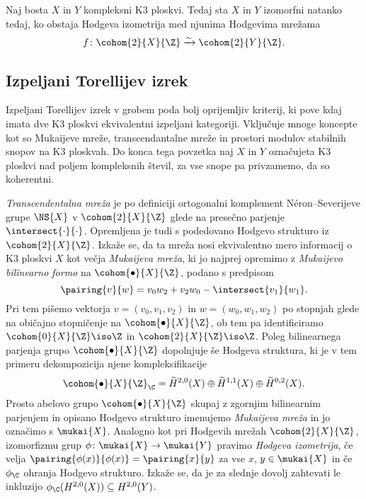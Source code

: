 \begin{izrek}
    Naj bosta $X$ in $Y$ kompleksni K3 ploskvi. Tedaj sta $X$ in $Y$ izomorfni natanko tedaj, ko obstaja Hodgeva izometrija med njunima Hodgevima mrežama
    \[
        f\colon \cohom{2}{X}{\Z} \xrightarrow{\sim} \cohom{2}{Y}{\Z}.
    \]
\end{izrek}


\subsection*{Izpeljani Torellijev izrek}

Izpeljani Torellijev izrek v grobem poda bolj oprijemljiv kriterij, ki pove kdaj imata dve K3 ploskvi ekvivalentni izpeljani kategoriji.
Vključuje mnoge koncepte kot so Mukaijeve mreže, transcendantalne mreže in prostori modulov stabilnih snopov na K3 ploskvah. Do konca tega povzetka naj $X$ in $Y$ označujeta K3 ploskvi nad poljem kompleksnih števil, za vse snope pa privzamemo, da so koherentni.  

\emph{Transcendentalna mreža} je po definiciji ortogonalni komplement Néron--Severijeve grupe $\NS{X}$ v $\cohom{2}{X}{\Z}$ glede na presečno parjenje $\intersect{\cdot}{\cdot}$. Opremljena je tudi s podedovano Hodgevo strukturo iz $\cohom{2}{X}{\Z}$. Izkaže se, da ta mreža nosi ekvivalentno mero informacij o K3 ploskvi $X$ kot večja \emph{Mukaijeva mreža}, ki jo najprej opremimo z \emph{Mukaijevo bilinearno formo} na $\cohom{\bullet}{X}{\Z}$, podano s predpisom 
\[
    \pairing{v}{w} = v_0w_2 + v_2w_0 - \intersect{v_1}{w_1}.
\]
Pri tem pišemo vektorja $v = (v_0, v_1, v_2)$ in $w = (w_0, w_1, w_2)$ po stopnjah glede na običajno stopničenje na $\cohom{\bullet}{X}{\Z}$, ob tem pa identificiramo $\cohom{0}{X}{\Z} \iso \Z$ in $\cohom{2}{X}{\Z} \iso \Z$. Poleg bilinearnega parjenja grupo $\cohom{\bullet}{X}{\Z}$ dopolnjuje še Hodgeva struktura, ki je v tem primeru dekompozicija njene kompleksifikacije
\[
    \cohom{\bullet}{X}{\Z}_\C = \widetilde{H}^{2,0}(X) \oplus \widetilde{H}^{1,1}(X) \oplus \widetilde{H}^{0,2}(X).
\]
Prosto abelovo grupo $\cohom{\bullet}{X}{\Z}$ skupaj z zgornjim bilinearnim parjenjem in opisano Hodgevo strukturo imenujemo \emph{Mukaijeva mreža} in jo označimo s $\mukai{X}$. Analogno kot pri Hodgevih mrežah $\cohom{2}{X}{\Z}$, izomorfizmu grup ${\phi \colon \mukai{X} \to \mukai{Y}}$ pravimo \emph{Hodgeva izometrija}, če velja $\pairing{\phi(x)}{\phi(x)} = \pairing{x}{y}$ za vse $x$, $y \in \mukai{X}$ in če $\phi_\C$ ohranja Hodgevo strukturo. Izkaže se, da je za slednje dovolj zahtevati le inkluzijo $\phi_\C(H^{2,0}(X)) \subseteq H^{2,0}(Y)$.

